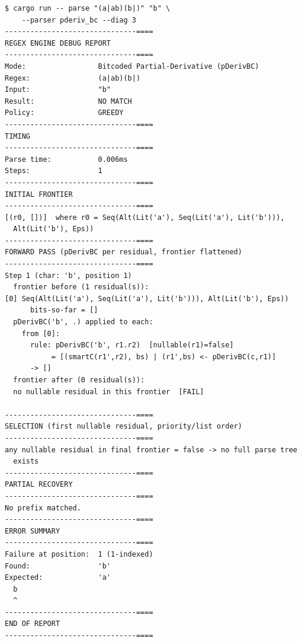 \begin{verbatim}
$ cargo run -- parse "(a|ab)(b|)" "b" \
    --parser pderiv_bc --diag 3
-------------------------------====
REGEX ENGINE DEBUG REPORT
-------------------------------====
Mode:                 Bitcoded Partial-Derivative (pDerivBC)
Regex:                (a|ab)(b|)
Input:                "b"
Result:               NO MATCH
Policy:               GREEDY
-------------------------------====
TIMING
-------------------------------====
Parse time:           0.006ms
Steps:                1
-------------------------------====
INITIAL FRONTIER
-------------------------------====
[(r0, [])]  where r0 = Seq(Alt(Lit('a'), Seq(Lit('a'), Lit('b'))),
  Alt(Lit('b'), Eps))
-------------------------------====
FORWARD PASS (pDerivBC per residual, frontier flattened)
-------------------------------====
Step 1 (char: 'b', position 1)
  frontier before (1 residual(s)):
[0] Seq(Alt(Lit('a'), Seq(Lit('a'), Lit('b'))), Alt(Lit('b'), Eps))  
      bits-so-far = []
  pDerivBC('b', .) applied to each:
    from [0]:
      rule: pDerivBC('b', r1.r2)  [nullable(r1)=false]
           = [(smartC(r1',r2), bs) | (r1',bs) <- pDerivBC(c,r1)]
      -> []
  frontier after (0 residual(s)):
  no nullable residual in this frontier  [FAIL]

-------------------------------====
SELECTION (first nullable residual, priority/list order)
-------------------------------====
any nullable residual in final frontier = false -> no full parse tree
  exists
-------------------------------====
PARTIAL RECOVERY
-------------------------------====
No prefix matched.
-------------------------------====
ERROR SUMMARY
-------------------------------====
Failure at position:  1 (1-indexed)
Found:                'b'
Expected:             'a'
  b
  ^
-------------------------------====
END OF REPORT
-------------------------------====
\end{verbatim}

